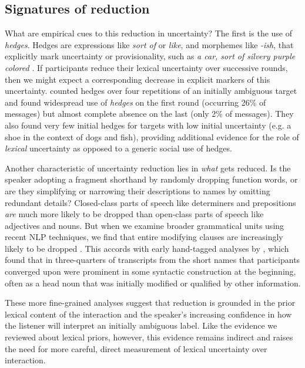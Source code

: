 \documentclass[11pt, floatsintext, jou]{apa6}
\begin{document}
\subsection{Signatures of reduction}

What are empirical cues to this reduction in uncertainty? The first is the use of \emph{hedges}. Hedges are expressions like \emph{sort of} or \emph{like}, and morphemes like \emph{-ish}, that explicitly mark uncertainty or provisionality, such as \emph{a car, sort of silvery purple colored} \cite{BrennanClark96_ConceptualPactsConversation,Fraser10_Hedging,MedlockBriscoe07_HedgeClassification}. If participants reduce their lexical uncertainty over successive rounds, then we might expect a corresponding decrease in explicit markers of this uncertainty.  counted hedges over four repetitions of an initially ambiguous target and found widespread use of \emph{hedges} on the first round (occurring 26\% of messages) but almost complete absence on the last (only 2\% of messages). They also found very few initial hedges for targets with low initial uncertainty (e.g. a shoe in the context of dogs and fish), providing additional evidence for the role of \emph{lexical} uncertainty as opposed to a generic social use of hedges.

Another characteristic of uncertainty reduction lies in \emph{what} gets reduced. Is the speaker adopting a fragment shorthand by randomly dropping function words, or are they simplifying or narrowing their descriptions to names by omitting redundant details? Closed-class parts of speech like determiners and prepositions \emph{are} much more likely to be dropped than open-class parts of speech like adjectives and nouns. But when we examine broader grammatical units using recent NLP techniques, we find that entire modifying clauses are increasingly likely to be dropped \cite{HawkinsFrankGoodman17_ConventionFormation}. This accords with early hand-tagged analyses by , which found that in three-quarters of transcripts from  the short names that participants converged upon were prominent in some syntactic construction at the beginning, often as a head noun that was initially modified or qualified by other information. 


These more fine-grained analyses suggest that reduction is grounded in the prior lexical content of the interaction and the speaker's increasing confidence in how the listener will interpret an initially ambiguous label. Like the evidence we reviewed about lexical priors, however, this evidence remains indirect and raises the need for more careful, direct measurement of lexical uncertainty over interaction. 
\end{document}
